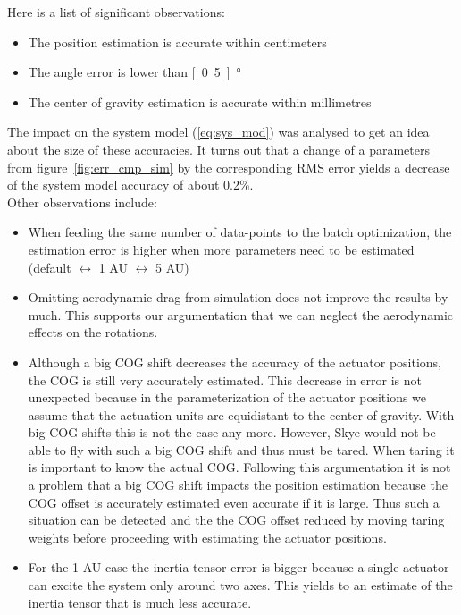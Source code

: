 Here is a list of significant observations:
\begin{itemize}
\item The position estimation is accurate within centimeters
\item The angle error is lower than \unit[0.5]{°}
\item The center of gravity estimation is accurate within millimetres
\end{itemize}
The impact on the system model (\ref{eq:sys_mod}) was analysed to get an idea about the size of these accuracies.
It turns out that a change of a parameters from figure~\ref{fig:err_cmp_sim} by the corresponding RMS error yields a decrease of the system model accuracy of about 0.2\%.\\
Other observations include:
\begin{itemize}
\item When feeding the same number of data-points to the batch optimization, the estimation error is higher when more parameters need to be estimated (default $\leftrightarrow$ 1 AU $\leftrightarrow$ 5 AU)
\item Omitting aerodynamic drag from simulation does not improve the results by much. This supports our argumentation that we can neglect the aerodynamic effects on the rotations.
\item Although a big COG shift decreases the accuracy of the actuator positions, the COG is still very accurately estimated.
This decrease in error is not unexpected because in the parameterization of the actuator positions we assume that the actuation units are equidistant to the center of gravity.
With big COG shifts this is not the case any-more.
However, Skye would not be able to fly with such a big COG shift and thus must be tared.
When taring it is important to know the actual COG.
Following this argumentation it is not a problem that a big COG shift impacts the position estimation because the COG offset is accurately estimated even accurate if it is large.
Thus such a situation can be detected and the the COG offset reduced by moving taring weights before proceeding with estimating the actuator positions.
\item For the 1 AU case the inertia tensor error is bigger because a single actuator can excite the system only around two axes.
This yields to an estimate of the inertia tensor that is much less accurate.
\end{itemize}


